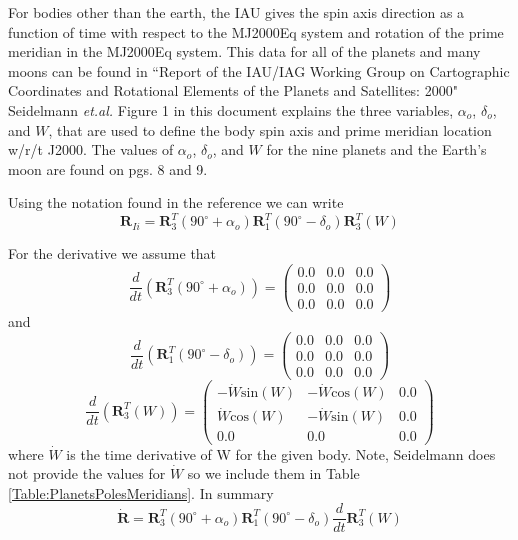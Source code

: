 {For bodies other than the earth,   the IAU gives the spin axis
direction as a function of time with respect to the MJ2000Eq
system and rotation of the prime meridian in the MJ2000Eq system.
This data for all of the planets and many moons can be found in
``Report of the IAU/IAG Working Group on Cartographic Coordinates
and Rotational Elements of the Planets and Satellites: 2000"
Seidelmann\cite{Seidelmann:etal:02} \emph{et.al.} Figure 1 in this
document explains the three variables, $\alpha_o$, $\delta_o$, and
$W$,  that are used to define the body spin axis and prime
meridian location w/r/t J2000.  The values of $\alpha_o$,
$\delta_o$, and $W$ for the nine planets and the Earth's moon are
found on pgs. 8 and 9.

Using the notation found in the reference we can write
%
\begin{equation}
     \mathbf{R}_{Ii} = \mathbf{R}_3^{T}(90^{\circ} + \alpha_o)
     \mathbf{R}_1^{T}(90^{\circ}- \delta_o)\mathbf{R}_3^T(W)
\end{equation}
%

For the derivative we assume that
%
\begin{equation}
    \frac{d}{dt}\left( \mathbf{R}_3^{T}(90^{\circ} + \alpha_o) \right)  =  \begin{pmatrix}
     0.0 & 0.0 & 0.0\\
     0.0 & 0.0 & 0.0\\
     0.0 & 0.0 & 0.0
     \end{pmatrix}
\end{equation}
%
and
\begin{equation}
    \frac{d}{dt}\left( \mathbf{R}_1^{T}(90^{\circ}- \delta_o) \right)  =  \begin{pmatrix}
     0.0 & 0.0 & 0.0\\
     0.0 & 0.0 & 0.0\\
     0.0 & 0.0 & 0.0
     \end{pmatrix}
\end{equation}
%
\begin{equation}
    \frac{d}{dt}\left( \mathbf{R}_3^{T}(W) \right)  =  \begin{pmatrix}
     -\dot{W}\mbox{sin}(W) & -\dot{W}\mbox{cos}(W) & 0.0\\
     \dot{W}\mbox{cos}(W) & -\dot{W}\mbox{sin}(W) & 0.0\\
     0.0 & 0.0 & 0.0
     \end{pmatrix}
\end{equation}
%
where $\dot{W}$ is the time derivative of W for the given body.
Note, Seidelmann\cite{Seidelmann:etal:02} does not provide the
values for $\dot{W}$ so we include them in Table
\ref{Table:PlanetsPolesMeridians}.
%
In summary
%
\begin{equation}
      \dot{\mathbf{R}} = \mathbf{R}_3^{T}(90^{\circ} + \alpha_o)
     \mathbf{R}_1^{T}(90^{\circ}- \delta_o)\frac{d}{dt}\mathbf{R}_3^{T}(W)
\end{equation}
%



}
